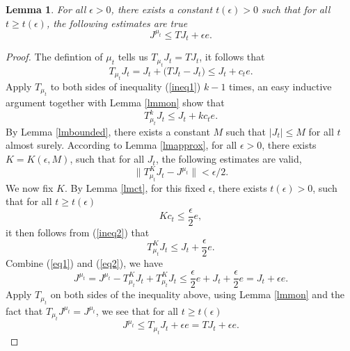\documentclass[12pt,a4paper]{amsart}
\numberwithin{equation}{section}
\theoremstyle{plain}
\newtheorem{Lemma}[Th]{Lemma}
\theoremstyle{definition}
\begin{document}
\begin{Lemma} \label{lmjmuest}
	For all $\epsilon > 0$, there exists a constant $t(\epsilon) > 0$ such that for all $t \geq t(\epsilon)$, the following estimates are true
	\begin{equation}\label{keyest}
	J^{\mu_t} \leq T J_t + \epsilon e.
	\end{equation}
\end{Lemma}
\begin{proof}
	The defintion of $\mu_t$ tells us $T_{\mu_t} J_t = T J_t$, it follows that 
	\begin{equation}\label{ineq1}
	T_{\mu_t} J_t = J_t + \big(TJ_t - J_t\big) \leq J_t + c_t e.
	\end{equation}
	 Apply $T_{\mu_t}$ to both sides of inequality (\ref{ineq1}) $k-1$ times, an easy inductive argument together with Lemma \ref{lmmon} show that
	\begin{equation}\label{ineq2}
	T_{\mu_t}^{k} J_t \leq J_t + k c_t e. 
	\end{equation}
	By Lemma \ref{lmbounded}, there exists a constant $M$ such that $\big|J_t\big| \leq M$ for all $t$ almost surely.  According to Lemma \ref{lmapprox}, for all $\epsilon > 0$,  there exists $K = K(\epsilon, M)$, such that for all $J_t$, the following estimates are valid,
	\begin{equation}\label{eq1}
	\|T_{\mu_t}^K J_t - J^{\mu_t}\| < \epsilon/2.
	\end{equation}
	We now fix $K$. By Lemma \ref{lmct}, for this fixed $\epsilon$, there exists $t(\epsilon) > 0$, such that for all $t \ge t(\epsilon)$
	$$
	Kc_t \leq \frac{\epsilon}{2} e, 
	$$
	it then follows from (\ref{ineq2}) that
	\begin{equation}\label{eq2}
	T_{\mu_t}^{K} J_t \leq J_t + \frac{\epsilon}{2} e.
	\end{equation}
	Combine (\ref{eq1}) and (\ref{eq2}), we have
	$$
	J^{\mu_t} = J^{\mu_t} - T_{\mu_t}^K J_t + T_{\mu_t}^K J_t \leq \frac{\epsilon}{2} e + J_t + \frac{\epsilon}{2} e = J_t + \epsilon e. 
	$$
	Apply $T_{\mu_t}$ on both sides of the inequality above, using Lemma \ref{lmmon} and the fact that $T_{\mu_t} J^{\mu_t} = J^{\mu_t}$, we see that for all $t \ge t(\epsilon)$
	$$
	J^{\mu_t} \leq T_{\mu_t} J_t + \epsilon e = TJ_t +\epsilon e.
	$$
\end{proof}
\end{document}
